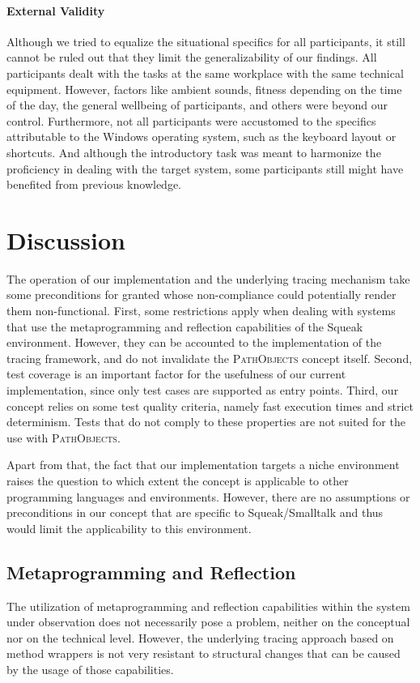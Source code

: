 \paragraph{External Validity}
Although we tried to equalize the situational specifics for all participants, it still cannot be ruled out that they limit the generalizability of our findings.
All participants dealt with the tasks at the same workplace with the same technical equipment.
However, factors like ambient sounds, fitness depending on the time of the day, the general wellbeing of participants, and others were beyond our control.
Furthermore, not all participants were accustomed to the specifics attributable to the Windows operating system, such as the keyboard layout or shortcuts.
And although the introductory task was meant to harmonize the proficiency in dealing with the target system, some participants still might have benefited from previous knowledge.

\clearpage
\section{Discussion}
\label{s:DiscussionLimitations}
The operation of our implementation and the underlying tracing mechanism take some preconditions for granted whose non-compliance could potentially render them non-functional.
First, some restrictions apply when dealing with systems that use the metaprogramming and reflection capabilities of the Squeak environment.
However, they can be accounted to the implementation of the tracing framework, and do not invalidate the \textsc{PathObjects} concept itself.
Second, test coverage is an important factor for the usefulness of our current implementation, since only test cases are supported as entry points. 
Third, our concept relies on some test quality criteria, namely fast execution times and strict determinism.
Tests that do not comply to these properties are not suited for the use with \textsc{PathObjects}.

Apart from that, the fact that our implementation targets a niche environment raises the question to which extent the concept is applicable to other programming languages and environments.
However, there are no assumptions or preconditions in our concept that are specific to  Squeak/Smalltalk and thus would limit the applicability to this environment.

\subsection{Metaprogramming and Reflection}
\label{ss:DiscussionLimitationsMeta}
The utilization of metaprogramming and reflection capabilities within the system under observation does not necessarily pose a problem, neither on the conceptual nor on the technical level.
However, the underlying tracing approach based on method wrappers is not very resistant to structural changes that can be caused by the usage of those capabilities.

